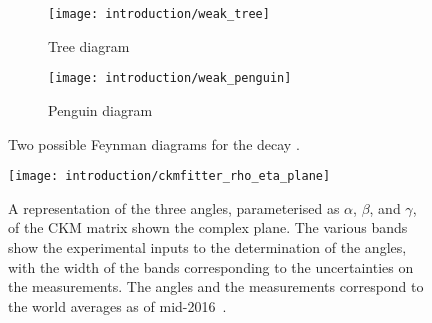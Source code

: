 \begin{figure}
  \begin{subfigure}{0.40\textwidth}
    \centering
    \texttt{[image: introduction/weak\_tree]}
    \caption{Tree diagram}
    \label{fig:intro:sm:weak_feynman:tree}
  \end{subfigure}
  \begin{subfigure}{0.55\textwidth}
    \centering
    \texttt{[image: introduction/weak\_penguin]}
    \caption{Penguin diagram}
    \label{fig:intro:sm:weak_feynman:penguin}
  \end{subfigure}
  \caption{%
    Two possible Feynman diagrams for the decay \decay{\PBzero}{\PKplus\Ppiminus}.
  }
  \label{fig:intro:sm:weak_feynman}
\end{figure}

\begin{figure}
  \centering
  \texttt{[image: introduction/ckmfitter\_rho\_eta\_plane]}
  \caption{%
    A representation of the three angles, parameterised as $\alpha$, $\beta$, 
    and $\gamma$, of the CKM matrix shown the complex plane.
    The various bands show the experimental inputs to the determination of the 
    angles, with the width of the bands corresponding to the uncertainties on 
    the measurements.
    The angles and the measurements correspond to the world averages as of 
    mid-2016~\cite{Charles:2004jd}.
  }
  \label{fig:intro:sm:ckm_angles}
\end{figure}
